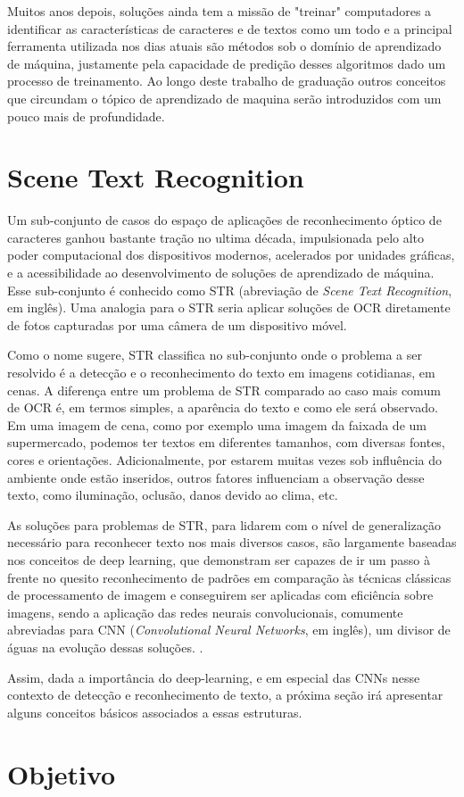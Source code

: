 Muitos anos depois, soluções ainda tem a missão de "treinar" computadores a identificar as características de caracteres e de textos como um todo e a principal ferramenta utilizada nos dias atuais são métodos sob o domínio de aprendizado de máquina, justamente pela capacidade de predição desses algoritmos dado um processo de treinamento. Ao longo deste trabalho de graduação outros conceitos que circundam o tópico de aprendizado de maquina serão introduzidos com um pouco mais de profundidade.

\section{Scene Text Recognition}

Um sub-conjunto de casos do espaço de aplicações de reconhecimento óptico de caracteres ganhou bastante tração no ultima década, impulsionada pelo alto poder computacional dos dispositivos modernos, acelerados por unidades gráficas, e a acessibilidade ao desenvolvimento de soluções de aprendizado de máquina. Esse sub-conjunto é conhecido como STR (abreviação de \textit{Scene Text Recognition}, em inglês). Uma analogia para o STR seria aplicar soluções de OCR diretamente de fotos capturadas por uma câmera de um dispositivo móvel.

Como o nome sugere, STR classifica no sub-conjunto onde o problema a ser resolvido é a detecção e o reconhecimento do texto em imagens cotidianas, em cenas. A diferença entre um problema de STR comparado ao caso mais comum de OCR é, em termos simples, a aparência do texto e como ele será observado. Em uma imagem de cena, como por exemplo uma imagem da faixada de um supermercado, podemos ter textos em diferentes tamanhos, com diversas fontes, cores e orientações. Adicionalmente, por estarem muitas vezes sob influência do ambiente onde estão inseridos, outros fatores influenciam a observação desse texto, como iluminação, oclusão, danos devido ao clima, etc.


As soluções para problemas de STR, para lidarem com o nível de generalização necessário para reconhecer texto nos mais diversos casos, são largamente baseadas nos conceitos de deep learning, que demonstram ser capazes de ir um passo à frente no quesito reconhecimento de padrões em comparação às técnicas clássicas de processamento de imagem e conseguirem ser aplicadas com eficiência sobre imagens, sendo a aplicação das redes neurais convolucionais, comumente abreviadas para CNN (\textit{Convolutional Neural Networks}, em inglês), um divisor de águas na evolução dessas soluções. \cite{DetcRecogWild,StrDlEra}.

Assim, dada a importância do deep-learning, e em especial das CNNs nesse contexto de detecção e reconhecimento de texto, a próxima seção irá apresentar alguns conceitos básicos associados a essas estruturas.

\section{Objetivo}

\lipsum[36]
